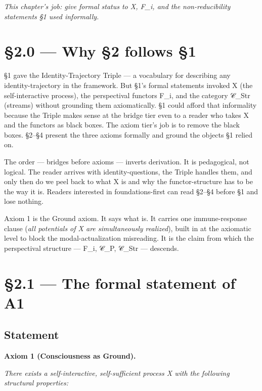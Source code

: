 \documentclass[11pt, openany]{book}
\newcommand{\sectionbreak}{\clearpage}
\begin{document}
\textit{This chapter's job: give formal status to X, F\_\allowbreak{}i, and the non-reducibility statements §1 used informally.}

\sectionbreak

\section{§2.0 --- Why §2 follows §1}

§1 gave the Identity-Trajectory Triple --- a vocabulary for describing any identity-trajectory in the framework. But §1's formal statements invoked X (the self-interactive process), the perspectival functors F\_\allowbreak{}i, and the category 𝒞\_\allowbreak{}Str (streams) without grounding them axiomatically. §1 could afford that informality because the Triple makes sense at the bridge tier even to a reader who takes X and the functors as black boxes. The axiom tier's job is to remove the black boxes. §2–§4 present the three axioms formally and ground the objects §1 relied on.

The order --- bridges before axioms --- inverts derivation. It is pedagogical, not logical. The reader arrives with identity-questions, the Triple handles them, and only then do we peel back to what X is and why the functor-structure has to be the way it is. Readers interested in foundations-first can read §2–§4 before §1 and lose nothing.

Axiom 1 is the Ground axiom. It says what is. It carries one immune-response clause (\textit{all potentials of X are simultaneously realized}), built in at the axiomatic level to block the modal-actualization misreading. It is the claim from which the perspectival structure --- F\_\allowbreak{}i, 𝒞\_\allowbreak{}P, 𝒞\_\allowbreak{}Str --- descends.

\sectionbreak

\section{§2.1 --- The formal statement of A1}

\subsection{Statement}

\textbf{Axiom 1 (Consciousness as Ground).}

\textit{There exists a self-interactive, self-sufficient process X with the following structural properties:}
\end{document}
